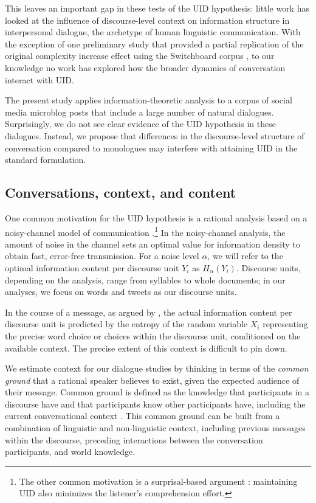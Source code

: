 \documentclass[11pt,letterpaper]{article}
\begin{document}
This leaves an important gap in these tests of the UID hypothesis: little work has looked at the influence of discourse-level context on information structure in interpersonal dialogue, the archetype of human linguistic communication.  With the exception of one preliminary study that provided a partial replication of the original complexity increase effect using the Switchboard corpus \cite{vega2009}, to our knowledge no work has explored how the broader dynamics of conversation interact with UID. 

The present study applies information-theoretic analysis to a corpus of social media microblog posts that include a large number of natural dialogues.  Surprisingly, we do not see clear evidence of the UID hypothesis in these dialogues.  Instead, we propose that differences in the discourse-level structure of conversation compared to monologues may interfere with attaining UID in the standard formulation.

\subsection{Conversations, context, and content}

One common motivation for the UID hypothesis is a rational analysis based on a noisy-channel model of communication \cite{levy2007}.\footnote{The other common motivation is a surprisal-based argument \cite{levy2008}: maintaining UID also minimizes the listener's comprehension effort.}  In the noisy-channel analysis, the amount of noise in the channel sets an optimal value for information density to obtain fast, error-free transmission.  For a noise level $\alpha$, we will refer to the optimal information content per discourse unit $Y_i$ as $H_\alpha(Y_i)$.  Discourse units, depending on the analysis, range from syllables to whole documents; in our analyses, we focus on words and tweets as our discourse units.

In the course of a message, as argued by , the actual information content per discourse unit is predicted by the entropy of the random variable $X_i$ representing the precise word choice or choices within the discourse unit, conditioned on the available context.  The precise extent of this context is difficult to pin down. 

We estimate context for our dialogue studies by thinking in terms of the {\it common ground} that a rational speaker believes to exist, given the expected audience of their message. Common ground is defined as the knowledge that participants in a discourse have and that participants know other participants have, including the current conversational context \cite{clark1996}. This common ground can be built from a combination of linguistic and non-linguistic context, including previous messages within the discourse, preceding interactions between the conversation participants, and world knowledge. %
\end{document}
